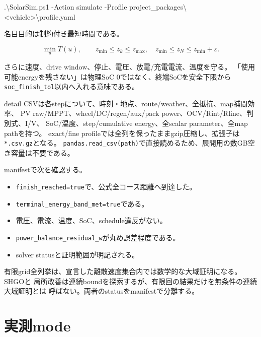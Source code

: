 \documentclass[
  japanese,
  a4paper,
]{article}
\newenvironment{Shaded}{}{}
\newcommand{\FunctionTok}[1]{\textcolor[rgb]{0.02,0.16,0.49}{#1}}
\newcommand{\NormalTok}[1]{#1}
\newcommand{\OperatorTok}[1]{\textcolor[rgb]{0.40,0.40,0.40}{#1}}
\providecommand{\tightlist}{%
  \setlength{\itemsep}{0pt}\setlength{\parskip}{0pt}}
\begin{document}
\begin{Shaded}
\begin{Highlighting}[]
\OperatorTok{.}\NormalTok{\textbackslash{}SolarSim}\OperatorTok{.}\FunctionTok{ps1} \OperatorTok{{-}}\NormalTok{Action simulate }\OperatorTok{{-}}\NormalTok{Profile project\_packages\textbackslash{}}\OperatorTok{\textless{}}\NormalTok{vehicle}\OperatorTok{\textgreater{}}\NormalTok{\textbackslash{}profile}\OperatorTok{.}\FunctionTok{yaml}
\end{Highlighting}
\end{Shaded}

名目目的は制約付き最短時間である。

\[
\min_u T(u),\qquad
z_{\min}\le z_k\le z_{\max},\quad
z_{\min}\le z_N\le z_{\min}+\varepsilon.
\]

さらに速度、drive window、停止、電圧、放電/充電電流、温度を守る。
「使用可能energyを残さない」は物理SoC 0ではなく、終端SoCを安全下限から
\texttt{soc\_finish\_tol}以内へ入れる意味である。

detail
CSVは各stepについて、時刻・地点、route/weather、全抵抗、map補間効率、 PV
raw/MPPT、wheel/DC/regen/aux/pack power、OCV/Rint/Rline、判別式、I/V、
SoC/温度、step/cumulative energy、全scalar parameter、全map pathを持つ。
exact/fine
profileでは全列を保ったままgzip圧縮し、拡張子は\texttt{*.csv.gz}となる。
\texttt{pandas.read\_csv(path)}で直接読めるため、展開用の数GB空き容量は不要である。

manifestで次を確認する。

\begin{itemize}
\tightlist
\item
  \texttt{finish\_reached=true}で、公式全コース距離へ到達した。
\item
  \texttt{terminal\_energy\_band\_met=true}である。
\item
  電圧、電流、温度、SoC、schedule違反がない。
\item
  \texttt{power\_balance\_residual\_w}が丸め誤差程度である。
\item
  solver statusと証明範囲が明記される。
\end{itemize}

有限grid全列挙は、宣言した離散速度集合内では数学的な大域証明になる。SHGOと
局所改善は連続boundを探索するが、有限回の結果だけを無条件の連続大域証明とは
呼ばない。両者のstatusをmanifestで分離する。

\section{実測mode}\label{ux5b9fux6e2cmode}
\end{document}
